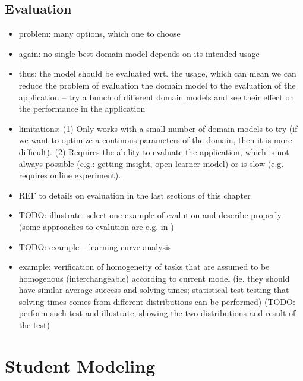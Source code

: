\subsection{Evaluation}

\begin{itemize}
\item problem: many options, which one to choose
\item again: no single best domain model depends on its intended usage
\item thus: the model should be evaluated wrt. the usage,
  which can mean we can reduce the problem of evaluation the domain model
  to the evaluation of the application -- try a bunch of different domain
  models and see their effect on the performance in the application
\item limitations:
  (1) Only works with a small number of domain models to try
  (if we want to optimize a continous parameters of the domain, then it
    is more difficult).
  (2) Requires the ability to evaluate the application, which is not
    always possible (e.g.: getting insight, open learner model) or is
    slow (e.g. requires online experiment).
\item REF to details on evaluation in the last sections of this chapter
\item TODO: illustrate: select one example of evalution and describe properly
  (some approaches to evalution are e.g. in \cite{rihak-phd})
\item TODO: example -- learning curve analysis \cite{its-domain-models}
\item example: verification of homogeneity of tasks that are assumed to be
  homogenous (interchangeable) according to current model (ie. they should
  have similar average success and solving times; statistical test testing
  that solving times comes from different distributions can be performed)
  (TODO: perform such test and illustrate, showing the two distributions
  and result of the test)
\end{itemize}



\section{Student Modeling}
\label{sec:student-modeling}

